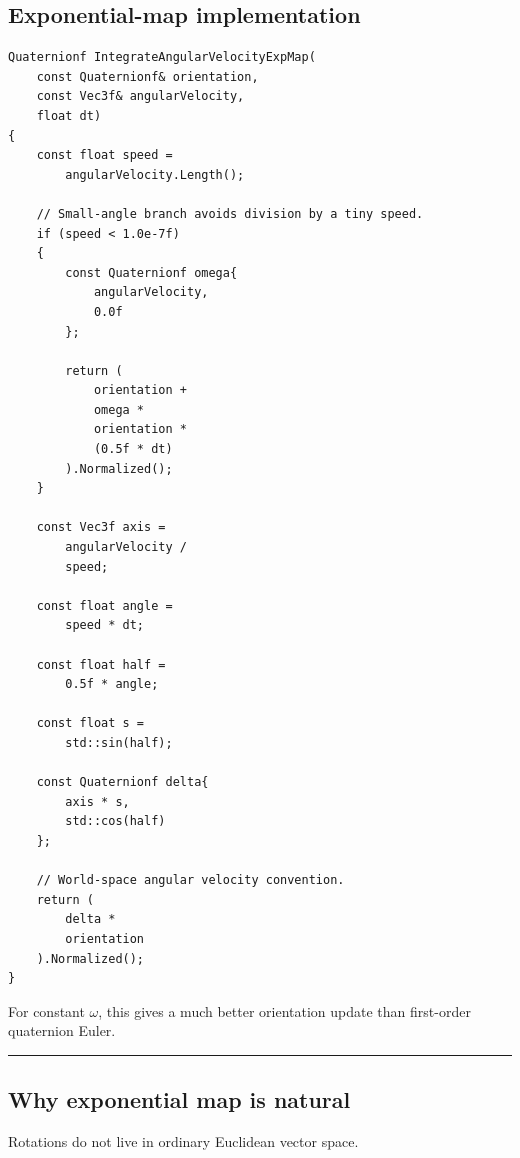 \subsection{Exponential-map implementation}\label{06-engine-ii-ch037-exponential-map-implementation}

\hypertarget{06-engine-ii-ch037-exponential-map-implementation}{}

\begin{verbatim}
Quaternionf IntegrateAngularVelocityExpMap(
    const Quaternionf& orientation,
    const Vec3f& angularVelocity,
    float dt)
{
    const float speed =
        angularVelocity.Length();

    // Small-angle branch avoids division by a tiny speed.
    if (speed < 1.0e-7f)
    {
        const Quaternionf omega{
            angularVelocity,
            0.0f
        };

        return (
            orientation +
            omega *
            orientation *
            (0.5f * dt)
        ).Normalized();
    }

    const Vec3f axis =
        angularVelocity /
        speed;

    const float angle =
        speed * dt;

    const float half =
        0.5f * angle;

    const float s =
        std::sin(half);

    const Quaternionf delta{
        axis * s,
        std::cos(half)
    };

    // World-space angular velocity convention.
    return (
        delta *
        orientation
    ).Normalized();
}
\end{verbatim}

For constant \(\omega\), this gives a much better orientation update than first-order quaternion Euler.

\begin{center}\rule{0.5\linewidth}{0.5pt}\end{center}

\subsection{Why exponential map is natural}\label{06-engine-ii-ch037-why-exponential-map-is-natural}

\hypertarget{06-engine-ii-ch037-why-exponential-map-is-natural}{}

Rotations do not live in ordinary Euclidean vector space.

